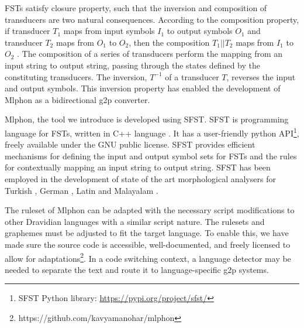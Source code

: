 \documentclass{ieeeaccess}
\begin{document}



FSTs satisfy closure property, such that the inversion and composition of transducers are two natural consequences. According to the composition property, if transducer $T_1$ maps from input symbols $I_1$ to output symbols $O_1$ and transducer $T_2$ maps from  $O_1$ to $O_2$, then the composition $T_1 || T_2 $ maps from $I_1$ to $O_2$   \cite{jurafsky2014speech}. The composition of a series of transducers perform the mapping from an input string to output string, passing through the states defined by the constituting transducers. The inversion, $T^{-1}$ of a transducer $T$, reverses the input and output symbols. This inversion property has enabled the  development of Mlphon as a bidirectional g2p converter.


Mlphon, the tool we introduce is developed using SFST.  SFST is programming language for FSTs, written in C++ language \cite{schmid2005programming}. It has a user-friendly python API\footnote{SFST Python library: \url{https://pypi.org/project/sfst/}}, freely available under the GNU public license. SFST provides efficient mechanisms for defining the input and output symbol sets for FSTs and the rules for contextually mapping an input string to output string. SFST has been employed in the development of state of the art morphological analysers for Turkish \cite{kayabacs2019trmor}, German \cite{schmid-etal-2004-smor}, Latin \cite{springmann2016latmor}  and Malayalam \cite{thottingal-2019-finite}.

The ruleset of Mlphon can be adapted with the necessary script modifications to other Dravidian languages with a similar script nature. The rulesets and graphemes must be adjusted to fit the target language. To enable this, we have made sure the source code is accessible, well-documented, and freely licensed to allow for adaptations\footnote{https://github.com/kavyamanohar/mlphon}. In a code switching context, a language detector may be needed to separate the text and route it to language-specific g2p systems.
\end{document}
